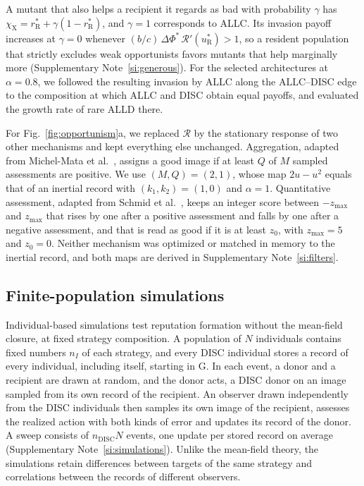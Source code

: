 \documentclass[10pt]{wlscirep}
\newcommand{\Rmap}{\mathscr{R}}            %
\newcommand{\rR}{r_{\mathrm{R}}^{*}}
\newcommand{\uR}{u_{\mathrm{R}}^{*}}
\newcommand{\dPhi}{\Delta\Phi^{*}}
\newcommand{\DISC}{\mathrm{DISC}}
\theoremstyle{plain}
\theoremstyle{remark}
\begin{document}
A mutant that also helps a recipient it regards as bad with probability $\gamma$ has $\chi_{\mathrm X}=\rR+\gamma(1-\rR)$, and $\gamma=1$ corresponds to ALLC. Its invasion payoff increases at $\gamma=0$ whenever $(b/c)\,\dPhi\,\Rmap'(\uR)>1$, so a resident population that strictly excludes weak opportunists favors mutants that help marginally more (Supplementary Note~\ref{si:generous}). For the selected architectures at $\alpha=0.8$, we followed the resulting invasion by ALLC along the ALLC--DISC edge to the composition at which ALLC and DISC obtain equal payoffs, and evaluated the growth rate of rare ALLD there.

For Fig.~\ref{fig:opportunism}a, we replaced $\Rmap$ by the stationary response of two other mechanisms and kept everything else unchanged. Aggregation, adapted from Michel-Mata et al.~\cite{michelmata2024}, assigns a good image if at least $Q$ of $M$ sampled assessments are positive. We use $(M,Q)=(2,1)$, whose map $2u-u^2$ equals that of an inertial record with $(k_1,k_2)=(1,0)$ and $\alpha=1$. Quantitative assessment, adapted from Schmid et al.~\cite{schmid2023}, keeps an integer score between $-z_{\max}$ and $z_{\max}$ that rises by one after a positive assessment and falls by one after a negative assessment, and that is read as good if it is at least $z_0$, with $z_{\max}=5$ and $z_0=0$. Neither mechanism was optimized or matched in memory to the inertial record, and both maps are derived in Supplementary Note~\ref{si:filters}.

\subsection*{Finite-population simulations}

Individual-based simulations test reputation formation without the mean-field closure, at fixed strategy composition. A population of $N$ individuals contains fixed numbers $n_I$ of each strategy, and every DISC individual stores a record of every individual, including itself, starting in G. In each event, a donor and a recipient are drawn at random, and the donor acts, a DISC donor on an image sampled from its own record of the recipient. An observer drawn independently from the DISC individuals then samples its own image of the recipient, assesses the realized action with both kinds of error and updates its record of the donor. A sweep consists of $n_{\DISC}N$ events, one update per stored record on average (Supplementary Note~\ref{si:simulations}). Unlike the mean-field theory, the simulations retain differences between targets of the same strategy and correlations between the records of different observers.
\end{document}
